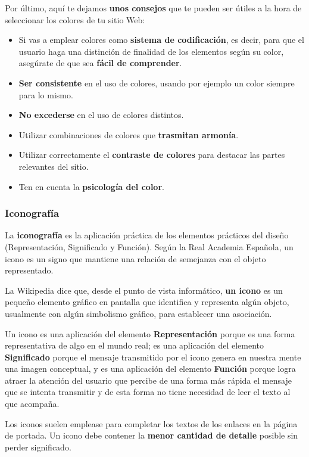 Por último, aquí te dejamos \textbf{unos consejos} que te pueden ser útiles a la hora de seleccionar los colores de tu sitio Web:

\begin{itemize}
    \item Si vas a emplear colores como \textbf{sistema de codificación}, es decir, para que el usuario haga una distinción de finalidad de los elementos según su color, asegúrate de que sea \textbf{fácil de comprender}.
    \item \textbf{Ser consistente }en el uso de colores, usando por ejemplo un color siempre para lo mismo.
    \item \textbf{No excederse} en el uso de colores distintos.
    \item Utilizar combinaciones de colores que \textbf{trasmitan armonía}.
    \item Utilizar correctamente el \textbf{contraste de colores} para destacar las partes relevantes del sitio.
    \item Ten en cuenta la \textbf{psicología del color}.
\end{itemize}

\subsubsection{Iconografía}
La \textbf{iconografía} es la aplicación práctica de los elementos prácticos del diseño (Representación, Significado y Función). Según la Real Academia Española, un icono es un signo que mantiene una relación de semejanza con el objeto representado.

La Wikipedia dice que, desde el punto de vista informático, \textbf{un icono} es un pequeño elemento gráfico en pantalla que identifica y representa algún objeto, usualmente con algún simbolismo gráfico, para establecer una asociación.

Un icono es una aplicación del elemento \textbf{Representación} porque es una forma representativa de algo en el mundo real; es una aplicación del elemento \textbf{Significado} porque el mensaje transmitido por el icono genera en nuestra mente una imagen conceptual, y es una aplicación del elemento \textbf{Función} porque logra atraer la atención del usuario que percibe de una forma más rápida el mensaje que se intenta transmitir y de esta forma no tiene necesidad de leer el texto al que acompaña.

Los iconos suelen emplease para completar los textos de los enlaces en la página de portada. Un icono debe contener la \textbf{menor cantidad de detalle} posible sin perder significado.

